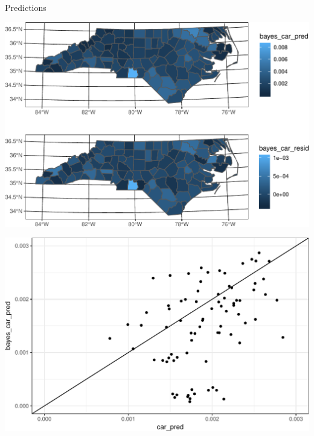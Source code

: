 \documentclass[11pt,ignorenonframetext,]{beamer}
\begin{document}
\begin{frame}{Predictions}
\protect\hypertarget{predictions-1}{}

\end{frame}

\begin{frame}{}
\protect\hypertarget{section-5}{}

\begin{center}\includegraphics[width=\textwidth]{Lec18_files/figure-beamer/unnamed-chunk-26-1} \end{center}

\end{frame}

\begin{frame}{}
\protect\hypertarget{section-6}{}

\begin{center}\includegraphics[width=\textwidth]{Lec18_files/figure-beamer/unnamed-chunk-27-1} \end{center}

\end{frame}
\end{document}
